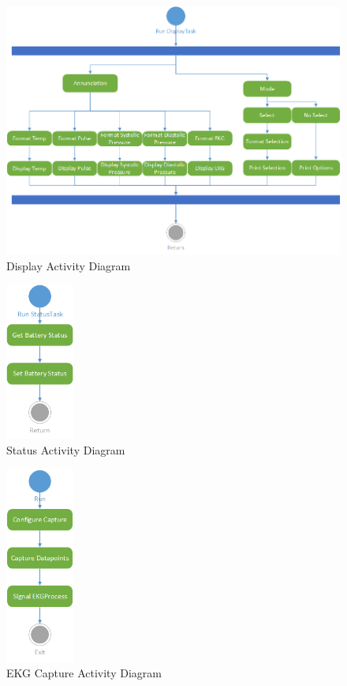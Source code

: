 \documentclass[12pt]{article} %
\begin{document}
    \begin{figure}[H]
      \centering
      \includegraphics[width=\textwidth]{../design/display_activity.png}
      \caption{Display Activity Diagram}
      \label{fig:displayActivity}
    \end{figure}

    \begin{figure}[H]
      \centering
      \includegraphics[width=0.2\textwidth]{../design/Status_activity.png}
      \caption{Status Activity Diagram}
      \label{fig:statusActivity}
    \end{figure}

    \begin{figure}[H]
      \centering
      \includegraphics[width=0.2\textwidth]{../design/ekgCapture_activity.png}
      \caption{EKG Capture Activity Diagram}
      \label{fig:ekgCaptureActivity}
    \end{figure}
\end{document}
